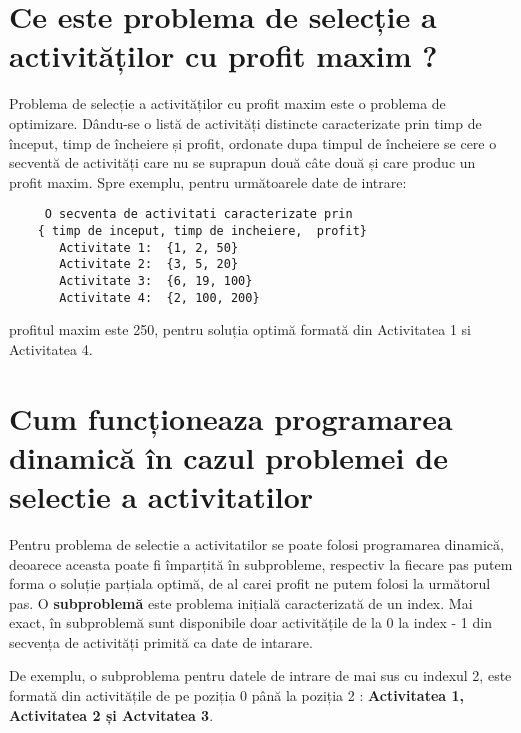 \section{Ce este problema de selecție a activităților cu profit maxim ?}
Problema de selecție a activităților cu profit maxim este o problema de optimizare. Dându-se o listă de activități distincte caracterizate prin timp de început, timp de încheiere și profit, ordonate dupa timpul de încheiere se cere o secventă de activități care nu se suprapun două câte două și care produc un profit maxim. 
Spre exemplu, pentru următoarele date de intrare:
\begin{lstlisting}
     O secventa de activitati caracterizate prin
    { timp de inceput, timp de incheiere,  profit}
       Activitate 1:  {1, 2, 50} 
       Activitate 2:  {3, 5, 20}
       Activitate 3:  {6, 19, 100}
       Activitate 4:  {2, 100, 200}
\end{lstlisting}
profitul maxim este 250, pentru soluția optimă formată din Activitatea 1 si Activitatea 4.

\section{Cum funcționeaza programarea dinamică în cazul problemei de selectie a activitatilor}
Pentru problema de selectie a activitatilor se poate folosi programarea dinamică, deoarece aceasta poate fi împarțită în subprobleme, respectiv la fiecare pas putem forma o soluție parțiala optimă, de al carei profit ne putem folosi la următorul pas. O \textbf{subproblemă} este problema inițială caracterizată de un index. Mai exact, în subproblemă sunt disponibile doar activitățile de la 0 la index - 1 din secvența de activități primită ca date de intarare.

De exemplu, o subproblema pentru datele de intrare de mai sus cu indexul 2, este formată din activitățile de pe poziția 0 până la poziția 2 : \textbf{Activitatea 1, Activitatea 2 și Actvitatea 3}. 

